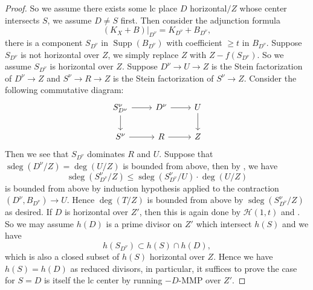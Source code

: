 \documentclass[letterpaper,reqno,12pt]{amsart}
\DeclareMathOperator{\Supp}{Supp}
\DeclareMathOperator{\sdeg}{sdeg}
\numberwithin{equation}{section}
\theoremstyle{plain}
\begin{document}
\begin{proof}
    So we assume there exists some lc place $D$ horizontal$/Z$ whose center intersects $S$, we assume $D\neq S$ first. Then consider the adjunction formula \[(K_X+B)|_{D^\nu}=K_{D^\nu}+B_{D^\nu},\] there is a component $S_{D^\nu}$ in $\Supp (B_{D^\nu})$ with coefficient $\geq t$ in $B_{D^\nu}$. Suppose $S_{D^\nu}$ is not horizontal over $Z$, we simply replace $Z$ with $Z-f(S_{D^\nu})$. So we assume $S_{D^\nu}$ is horizontal over $Z$. Suppose $D^\nu\to U\to Z$ is the Stein factorization of $D^\nu\to Z$ and $S^\nu\to R\to Z$ is the Stein factorization of $S^\nu\to Z$. Consider the following commutative diagram:
    \[\begin{tikzcd}
	{S^\nu_{D^\nu}} & {D^\nu} & U \\
	{S^\nu} & R & Z
	\arrow[from=1-1, to=1-2]
	\arrow[from=1-1, to=2-1]
	\arrow[from=1-2, to=1-3]
	\arrow[from=1-3, to=2-3]
	\arrow[from=2-1, to=2-2]
	\arrow[from=2-2, to=2-3]
\end{tikzcd}\]
Then we see that $S_{D^\nu}$ dominates $R$ and $U$. Suppose that $\sdeg(D^\nu/Z)=\deg(U/Z)$ is bounded from above, then by , we have 
\[\sdeg(S^\nu_{D^\nu}/Z)\leq \sdeg(S^\nu_{D^\nu}/U)\cdot\deg(U/Z)\]
is bounded from above by induction hypothesis applied to the contraction $(D^\nu,B_{D^\nu})\to U$. Hence $\deg(T/Z)$ is bounded from above by $\sdeg(S^\nu_{D^\nu}/Z)$ as desired. If $D$ is horizontal over $Z'$, then this is again done by $\mathcal H(1,t)$ and . So we may assume $h(D)$ is a prime divisor on $Z'$ which intersect $h(S)$ and we have\[h(S_{D^\nu})\subset h(S)\cap h(D),\] which is also a closed subset of $h(S)$ horizontal over $Z$. Hence we have $h(S)=h(D)$ as reduced divisors, in particular, it suffices to prove the case for $S=D$ is itself the lc center by running $-D$-MMP over $Z'$. 


\end{proof}
\end{document}
